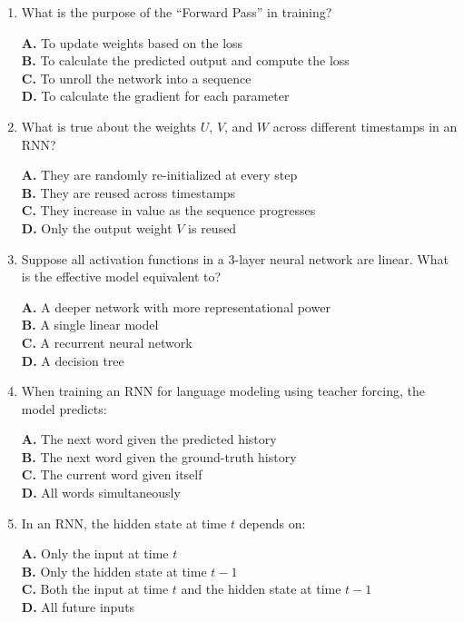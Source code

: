 \documentclass[11pt]{article}
\begin{document}
\begin{enumerate}[label=Q\arabic*., leftmargin=*]
\item What is the purpose of the ``Forward Pass'' in training?

\textbf{A.} To update weights based on the loss\\
\textbf{B.} To calculate the predicted output and compute the loss\\
\textbf{C.} To unroll the network into a sequence\\
\textbf{D.} To calculate the gradient for each parameter

\item What is true about the weights $U$, $V$, and $W$ across different timestamps in an RNN?

\textbf{A.} They are randomly re-initialized at every step\\
\textbf{B.} They are reused across timestamps\\
\textbf{C.} They increase in value as the sequence progresses\\
\textbf{D.} Only the output weight $V$ is reused

\item Suppose all activation functions in a 3-layer neural network are linear. What is the effective model equivalent to?

\textbf{A.} A deeper network with more representational power\\
\textbf{B.} A single linear model\\
\textbf{C.} A recurrent neural network\\
\textbf{D.} A decision tree

\item When training an RNN for language modeling using teacher forcing, the model predicts:

\textbf{A.} The next word given the predicted history\\
\textbf{B.} The next word given the ground-truth history\\
\textbf{C.} The current word given itself\\
\textbf{D.} All words simultaneously

\item In an RNN, the hidden state at time $t$ depends on:

\textbf{A.} Only the input at time $t$\\
\textbf{B.} Only the hidden state at time $t-1$\\
\textbf{C.} Both the input at time $t$ and the hidden state at time $t-1$\\
\textbf{D.} All future inputs


\end{enumerate}
\end{document}
